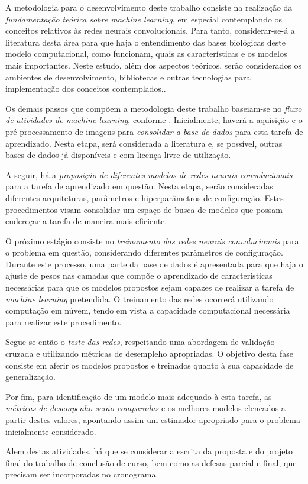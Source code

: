 A metodologia para o desenvolvimento deste trabalho consiste na realização da \emph{fundamentação teórica sobre machine learning}, em especial contemplando os conceitos relativos às redes neurais convolucionais. Para tanto, considerar-se-á a literatura desta área para que haja o entendimento das bases biológicas deste modelo computacional, como funcionam, quais as características e os modelos mais importantes. Neste estudo, além dos aspectos teóricos, serão considerados os ambientes de desenvolvimento, bibliotecas e outras tecnologias para implementação dos conceitos contemplados..

Os demais passos que compõem a metodologia deste trabalho baseiam-se no \emph{fluxo de atividades de machine learning}, conforme \cite{marsland2015machine}. Inicialmente, haverá a aquisição e o pré-processamento de imagens para \emph{consolidar a base de dados} para esta tarefa de aprendizado. Nesta etapa, será considerada a literatura e, se possível, outras bases de dados já disponíveis e com licença livre de utilização.

A seguir, há a \emph{proposição de diferentes modelos de redes neurais convolucionais} para a tarefa de aprendizado em questão. Nesta etapa, serão consideradas diferentes arquiteturas, parâmetros e hiperparâmetros de configuração. Estes procedimentos visam consolidar um espaço de busca de modelos que possam endereçar a tarefa de maneira mais eficiente.

O próximo estágio consiste no \emph{treinamento das redes neurais convolucionais} para o problema em questão, considerando diferentes parâmetros de configuração. Durante este processo, uma parte da base de dados é apresentada para que haja o ajuste de pesos nas camadas que compõe o aprendizado de características necessárias para que os modelos propostos sejam capazes de realizar a tarefa de \emph{machine learning} pretendida. O treinamento das redes ocorrerá utilizando computação em núvem, tendo em vista a capacidade computacional necessária para realizar este procedimento.

Segue-se então o \emph{teste das redes}, respeitando uma abordagem de validação cruzada e utilizando métricas de desempleho apropriadas. O objetivo desta fase consiste em aferir os modelos propostos e treinados quanto à sua capacidade de generalização.

Por fim, para identificação de um modelo mais adequado à esta tarefa, as \emph{métricas de desempenho serão comparadas} e os melhores modelos elencados a partir destes valores, apontando assim um estimador apropriado para o problema inicialmente considerado.

Alem destas atividades, há que se considerar a escrita da proposta e do projeto final do trabalho de conclusão de curso, bem como as defesas parcial e final, que precisam ser incorporadas no cronograma.
